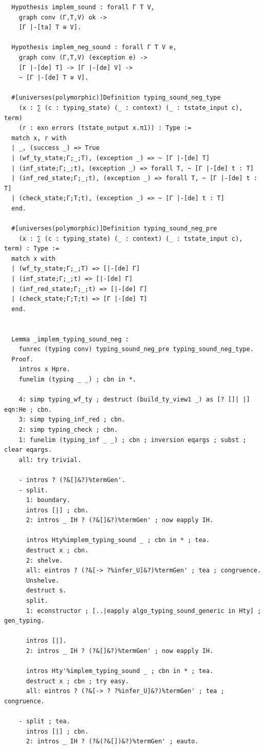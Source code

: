 \begin{lstlisting}
  Hypothesis implem_sound : forall Γ T V,
    graph conv (Γ,T,V) ok ->
    [Γ |-[ta] T ≅ V].

  Hypothesis implem_neg_sound : forall Γ T V e,
    graph conv (Γ,T,V) (exception e) ->
    [Γ |-[de] T] -> [Γ |-[de] V] ->
    ~ [Γ |-[de] T ≅ V].

  #[universes(polymorphic)]Definition typing_sound_neg_type
    (x : ∑ (c : typing_state) (_ : context) (_ : tstate_input c), term)
    (r : exn errors (tstate_output x.π1)) : Type :=
  match x, r with
  | _, (success _) => True
  | (wf_ty_state;Γ;_;T), (exception _) => ~ [Γ |-[de] T]
  | (inf_state;Γ;_;t), (exception _) => forall T, ~ [Γ |-[de] t : T]
  | (inf_red_state;Γ;_;t), (exception _) => forall T, ~ [Γ |-[de] t : T]
  | (check_state;Γ;T;t), (exception _) => ~ [Γ |-[de] t : T]
  end.

  #[universes(polymorphic)]Definition typing_sound_neg_pre
    (x : ∑ (c : typing_state) (_ : context) (_ : tstate_input c), term) : Type :=
  match x with
  | (wf_ty_state;Γ;_;T) => [|-[de] Γ]
  | (inf_state;Γ;_;t) => [|-[de] Γ]
  | (inf_red_state;Γ;_;t) => [|-[de] Γ]
  | (check_state;Γ;T;t) => [Γ |-[de] T]
  end.


  Lemma _implem_typing_sound_neg :
    funrec (typing conv) typing_sound_neg_pre typing_sound_neg_type.
  Proof.
    intros x Hpre.
    funelim (typing _ _) ; cbn in *.

    4: simp typing_wf_ty ; destruct (build_ty_view1 _) as [? []| |] eqn:He ; cbn.
    3: simp typing_inf_red ; cbn.
    2: simp typing_check ; cbn.
    1: funelim (typing_inf _ _) ; cbn ; inversion eqargs ; subst ; clear eqargs.
    all: try trivial.

    - intros ? (?&[]&?)%termGen'.
    - split.
      1: boundary.
      intros [|] ; cbn.
      2: intros _ IH ? (?&[]&?)%termGen' ; now eapply IH.
      
      intros Hty%implem_typing_sound _ ; cbn in * ; tea.
      destruct x ; cbn.
      2: shelve.
      all: eintros ? (?&[-> ?%infer_U]&?)%termGen' ; tea ; congruence.
      Unshelve.
      destruct s.
      split.
      1: econstructor ; [..|eapply algo_typing_sound_generic in Hty] ; gen_typing.

      intros [|].
      2: intros _ IH ? (?&[]&?)%termGen' ; now eapply IH.

      intros Hty'%implem_typing_sound _ ; cbn in * ; tea.
      destruct x ; cbn ; try easy.
      all: eintros ? (?&[-> ? ?%infer_U]&?)%termGen' ; tea ; congruence.

    - split ; tea.
      intros [|] ; cbn.
      2: intros _ IH ? (?&(?&[])&?)%termGen' ; eauto.


\end{lstlisting}
